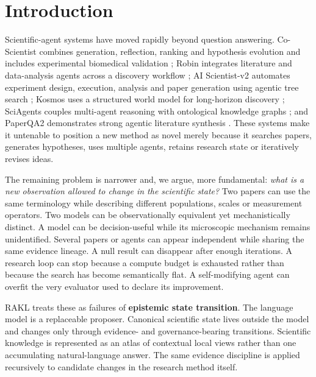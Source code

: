 \documentclass[11pt]{article}
\newcommand{\RAKL}{\textsc{RAKL}}
\begin{document}
\section{Introduction}
Scientific-agent systems have moved rapidly beyond question answering. Co-Scientist combines generation, reflection, ranking and hypothesis evolution and includes experimental biomedical validation \citep{gottweis2026coscientist}; Robin integrates literature and data-analysis agents across a discovery workflow \citep{ghareeb2026robin}; AI Scientist-v2 automates experiment design, execution, analysis and paper generation using agentic tree search \citep{yamada2025aiscientistv2}; Kosmos uses a structured world model for long-horizon discovery \citep{mitchener2025kosmos}; SciAgents couples multi-agent reasoning with ontological knowledge graphs \citep{ghafarollahi2024sciagents}; and PaperQA2 demonstrates strong agentic literature synthesis \citep{skarlinski2024paperqa2}. These systems make it untenable to position a new method as novel merely because it searches papers, generates hypotheses, uses multiple agents, retains research state or iteratively revises ideas.

The remaining problem is narrower and, we argue, more fundamental: \emph{what is a new observation allowed to change in the scientific state?} Two papers can use the same terminology while describing different populations, scales or measurement operators. Two models can be observationally equivalent yet mechanistically distinct. A model can be decision-useful while its microscopic mechanism remains unidentified. Several papers or agents can appear independent while sharing the same evidence lineage. A null result can disappear after enough iterations. A research loop can stop because a compute budget is exhausted rather than because the search has become semantically flat. A self-modifying agent can overfit the very evaluator used to declare its improvement.

\RAKL{} treats these as failures of \textbf{epistemic state transition}. The language model is a replaceable proposer. Canonical scientific state lives outside the model and changes only through evidence- and governance-bearing transitions. Scientific knowledge is represented as an atlas of contextual local views rather than one accumulating natural-language answer. The same evidence discipline is applied recursively to candidate changes in the research method itself.
\end{document}
